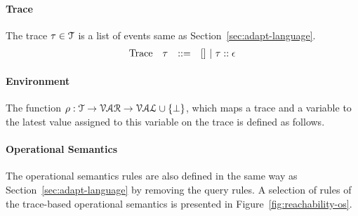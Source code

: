 \paragraph*{Trace}
The trace $\mathtt{\tau} \in \mathcal{T} $ is a list of events same as Section~\ref{sec:adapt-language}.
\[
\begin{array}{llll}
\mbox{Trace} & \mathtt{\tau}
& ::= & [] ~|~ \mathtt{\tau} :: \mathtt{\epsilon}
\end{array}
\]
\paragraph*{Environment}
The function $\rho : {\mathcal{T}} \to \mathcal{VAR} \to \mathcal{VAL} \cup \{\bot\}$, which maps a trace and a variable to the latest value assigned to this variable on the trace is defined as follows.
%
\paragraph{Operational Semantics}
The operational semantics rules are also defined in the same way as Section~\ref{sec:adapt-language} by removing the query rules.
A selection of rules of the trace-based operational semantics is presented in Figure~\ref{fig:reachability-os}. 
%
